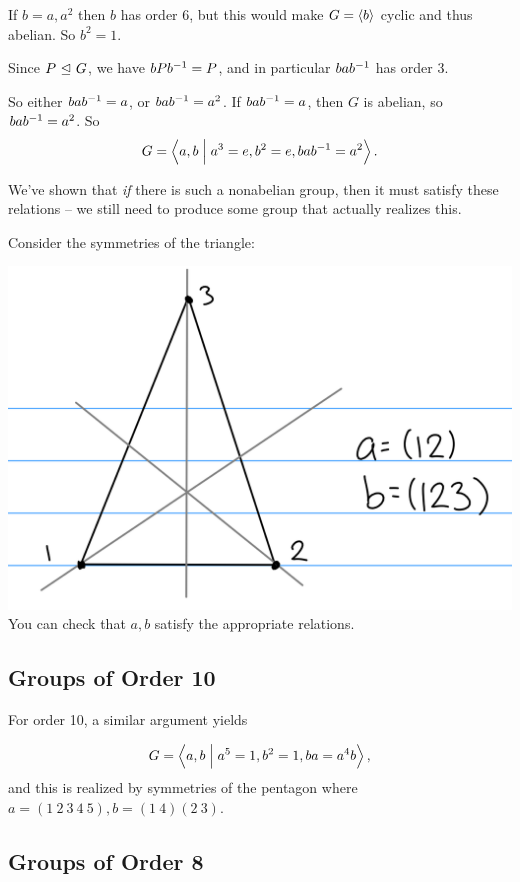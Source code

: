 If \(b=a, a^2\) then \(b\) has order 6, but this would make
\(G = \left\langle{b}\right\rangle\) cyclic and thus abelian. So \(b^2=1\).

Since \(P {~\trianglelefteq~} G\), we have \(bPb^{-1} = P\), and in particular
\(bab^{-1}\) has order 3.

So either \(bab^{-1} = a\), or \(bab^{-1} = a^2\). If \(bab^{-1} = a\),
then \(G\) is abelian, so \(bab^{-1} = a^2\). So \[
G = \left\langle{a, b \mathrel{\Big|}a^3 = e, b^2 = e, bab^{-1}= a^2}\right\rangle
.\]

We've shown that \emph{if} there is such a nonabelian group, then it
must satisfy these relations -- we still need to produce some group that
actually realizes this.

Consider the symmetries of the triangle:

\includegraphics{figures/2019-09-03-09:52.png}\\

You can check that \(a,b\) satisfy the appropriate relations.

\hypertarget{groups-of-order-10}{%
\subsection{Groups of Order 10}\label{groups-of-order-10}}

For order 10, a similar argument yields

\[
G = \left\langle{a, b \mathrel{\Big|}a^5 = 1, b^2 = 1, ba=a^4b}\right\rangle
,\] and this is realized by symmetries of the pentagon where
\(a = (1~2~3~4~5), b=(1~4)(2~3)\).

\hypertarget{groups-of-order-8}{%
\subsection{Groups of Order 8}\label{groups-of-order-8}}

